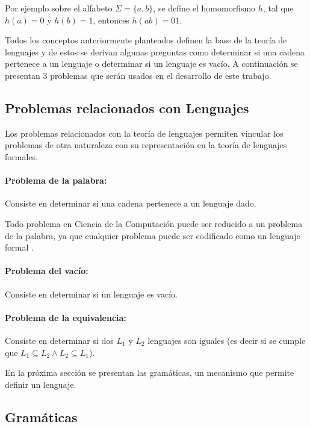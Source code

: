Por ejemplo sobre el alfabeto $\Sigma=\{a,b\}$, se define el homomorfismo $h$, tal que $h(a)=0$ y $h(b)=1$, entonces
$h(ab)=01$.

Todos los conceptos anteriormente planteados definen la base de la teoría de lenguajes y de estos se derivan algunas 
preguntas como determinar si una cadena pertenece a un lenguaje o determinar si un lenguaje es vacío. A continuación se presentan 3 problemas que serán usados en el desarrollo de este trabajo.

\subsection{Problemas relacionados con Lenguajes}

Los problemas relacionados con la teoría de lenguajes permiten vincular los problemas de otra naturaleza 
con su representación en la teoría de lenguajes formales. 

\paragraph{Problema de la palabra:} Consiste en determinar si una cadena pertenece a un lenguaje dado.

Todo problema en Ciencia de la Computación puede ser reducido a un problema de la palabra, ya que cualquier problema
puede ser codificado como un lenguaje formal \cite{authomataTheory}.

\paragraph{Problema del vacío:} Consiste en determinar si un lenguaje es vacío. 

\paragraph{Problema de la equivalencia:} Consiste en determinar si dos $L_1$ y $L_2$ lenguajes son iguales (es decir si se cumple que
$L_1\subseteq L_2 \wedge L_2\subseteq L_1$).

En la próxima sección se presentan las gramáticas, un mecanismo que permite definir un lenguaje.

\subsection{Gramáticas}

